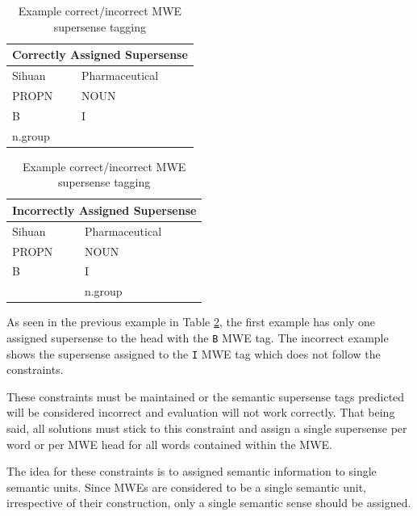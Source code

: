 \begin{table}[!htbp]
\small
\begin{framed}
  \centering
  \begin{ttfamily}
    \begin{minipage}{.5\textwidth}
      \centering
      \begin{tabular}{ll}
        \multicolumn{2}{c}{Correctly Assigned Supersense}\\
        \hline
        Sihuan  & Pharmaceutical \\
        PROPN   & NOUN \\
        B       & I \\
        n.group &\\
      \end{tabular}
    \end{minipage}\hfill
    \begin{minipage}{.5\textwidth}
      \centering
      \begin{tabular}{ll}
        \multicolumn{2}{c}{Incorrectly Assigned Supersense}\\
        \hline
        Sihuan  & Pharmaceutical \\
        PROPN   & NOUN \\
        B       & I \\
        \ & n.group\\
      \end{tabular}
    \end{minipage}\hfill
  \end{ttfamily}
  \caption{Example correct/incorrect MWE supersense tagging}
  \label{tab:supersensetagging}
\end{framed}
\end{table}

As seen in the previous example in Table \ref{tab:supersensetagging}, the first example has only one assigned supersense to the head with the \texttt{B} MWE tag. The incorrect example shows the supersense assigned to the \texttt{I} MWE tag which does not follow the constraints.

These constraints must be maintained or the semantic supersense tags predicted will be considered incorrect and evaluation will not work correctly. That being said, all solutions must stick to this constraint and assign a single supersense per word or per MWE head for all words contained within the MWE.

The idea for these constraints is to assigned semantic information to single semantic units. Since MWEs are considered to be a single semantic unit, irrespective of their construction, only a single semantic sense should be assigned. 

